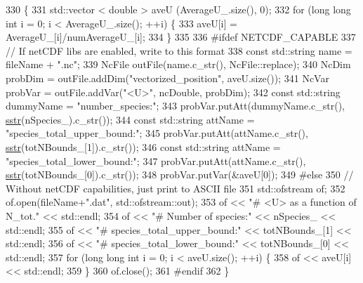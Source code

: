 \begin{DoxyCode}
330                                                 \{
331                 std::vector < double > aveU (AverageU\_.size(), 0);
332                 \textcolor{keywordflow}{for} (\textcolor{keywordtype}{long} \textcolor{keywordtype}{long} \textcolor{keywordtype}{int} i = 0; i < AverageU\_.size(); ++i) \{
333                                 aveU[i] = AverageU\_[i]/numAverageU\_[i]; 
334                 \}
335                 
336 \textcolor{preprocessor}{#ifdef NETCDF\_CAPABLE}
337     \textcolor{comment}{// If netCDF libs are enabled, write to this format}
338     \textcolor{keyword}{const} std::string name = fileName + \textcolor{stringliteral}{".nc"};
339                 NcFile outFile(name.c\_str(), NcFile::replace);
340                 NcDim probDim = outFile.addDim(\textcolor{stringliteral}{"vectorized\_position"}, aveU.size());
341                 NcVar probVar = outFile.addVar(\textcolor{stringliteral}{"<U>"}, ncDouble, probDim);
342                 \textcolor{keyword}{const} std::string dummyName = \textcolor{stringliteral}{"number\_species:"};
343                 probVar.putAtt(dummyName.c\_str(), \hyperlink{utilities_8h_a8feb627efa8e8113cdf95f9a6151a088}{sstr}(nSpecies\_).c\_str());
344                 \textcolor{keyword}{const} std::string attName = \textcolor{stringliteral}{"species\_total\_upper\_bound:"};
345                 probVar.putAtt(attName.c\_str(), \hyperlink{utilities_8h_a8feb627efa8e8113cdf95f9a6151a088}{sstr}(totNBounds\_[1]).c\_str());
346                 \textcolor{keyword}{const} std::string attName = \textcolor{stringliteral}{"species\_total\_lower\_bound:"};
347                 probVar.putAtt(attName.c\_str(), \hyperlink{utilities_8h_a8feb627efa8e8113cdf95f9a6151a088}{sstr}(totNBounds\_[0]).c\_str());
348                 probVar.putVar(&aveU[0]);
349 \textcolor{preprocessor}{#else}
350                 \textcolor{comment}{// Without netCDF capabilities, just print to ASCII file}
351                 std::ofstream of;
352                 of.open(fileName+\textcolor{stringliteral}{".dat"}, std::ofstream::out);
353                 of << \textcolor{stringliteral}{"# <U> as a function of N\_tot."} << std::endl;
354                 of << \textcolor{stringliteral}{"# Number of species:"} << nSpecies\_ << std::endl;
355                 of << \textcolor{stringliteral}{"# species\_total\_upper\_bound:"} << totNBounds\_[1] << std::endl;
356                 of << \textcolor{stringliteral}{"# species\_total\_lower\_bound:"} << totNBounds\_[0] << std::endl;
357                 \textcolor{keywordflow}{for} (\textcolor{keywordtype}{long} \textcolor{keywordtype}{long} \textcolor{keywordtype}{int} i = 0; i < aveU.size(); ++i) \{
358                                 of << aveU[i] << std::endl;
359                 \}
360                 of.close();
361 \textcolor{preprocessor}{#endif}
362 \}
\end{DoxyCode}
\hypertarget{classsim_system_afcd8467fd7611184ad32138fc410813c}{}
